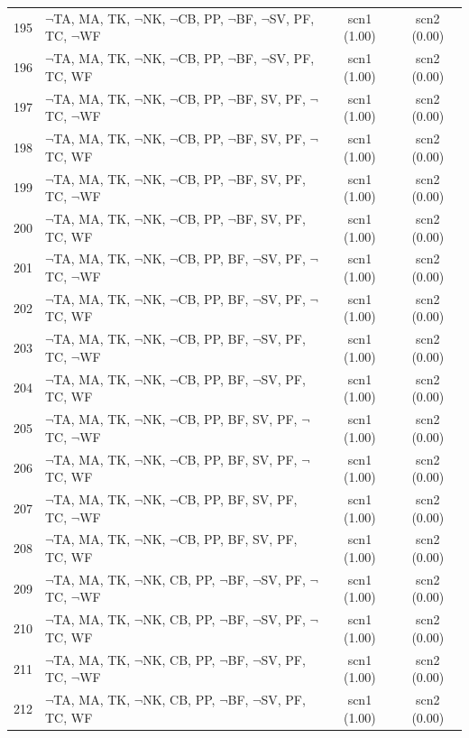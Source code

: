 \documentclass[12pt]{article}
\begin{document}
\begin{longtable}{|l|l|c|c|}
195 & $\neg$TA, MA, TK, $\neg$NK, $\neg$CB, PP, $\neg$BF, $\neg$SV, PF, TC, $\neg$WF & scn1 (1.00) & scn2 (0.00)\\
196 & $\neg$TA, MA, TK, $\neg$NK, $\neg$CB, PP, $\neg$BF, $\neg$SV, PF, TC, WF & scn1 (1.00) & scn2 (0.00)\\
197 & $\neg$TA, MA, TK, $\neg$NK, $\neg$CB, PP, $\neg$BF, SV, PF, $\neg$TC, $\neg$WF & scn1 (1.00) & scn2 (0.00)\\
198 & $\neg$TA, MA, TK, $\neg$NK, $\neg$CB, PP, $\neg$BF, SV, PF, $\neg$TC, WF & scn1 (1.00) & scn2 (0.00)\\
199 & $\neg$TA, MA, TK, $\neg$NK, $\neg$CB, PP, $\neg$BF, SV, PF, TC, $\neg$WF & scn1 (1.00) & scn2 (0.00)\\
200 & $\neg$TA, MA, TK, $\neg$NK, $\neg$CB, PP, $\neg$BF, SV, PF, TC, WF & scn1 (1.00) & scn2 (0.00)\\
201 & $\neg$TA, MA, TK, $\neg$NK, $\neg$CB, PP, BF, $\neg$SV, PF, $\neg$TC, $\neg$WF & scn1 (1.00) & scn2 (0.00)\\
202 & $\neg$TA, MA, TK, $\neg$NK, $\neg$CB, PP, BF, $\neg$SV, PF, $\neg$TC, WF & scn1 (1.00) & scn2 (0.00)\\
203 & $\neg$TA, MA, TK, $\neg$NK, $\neg$CB, PP, BF, $\neg$SV, PF, TC, $\neg$WF & scn1 (1.00) & scn2 (0.00)\\
204 & $\neg$TA, MA, TK, $\neg$NK, $\neg$CB, PP, BF, $\neg$SV, PF, TC, WF & scn1 (1.00) & scn2 (0.00)\\
205 & $\neg$TA, MA, TK, $\neg$NK, $\neg$CB, PP, BF, SV, PF, $\neg$TC, $\neg$WF & scn1 (1.00) & scn2 (0.00)\\
206 & $\neg$TA, MA, TK, $\neg$NK, $\neg$CB, PP, BF, SV, PF, $\neg$TC, WF & scn1 (1.00) & scn2 (0.00)\\
207 & $\neg$TA, MA, TK, $\neg$NK, $\neg$CB, PP, BF, SV, PF, TC, $\neg$WF & scn1 (1.00) & scn2 (0.00)\\
208 & $\neg$TA, MA, TK, $\neg$NK, $\neg$CB, PP, BF, SV, PF, TC, WF & scn1 (1.00) & scn2 (0.00)\\
209 & $\neg$TA, MA, TK, $\neg$NK, CB, PP, $\neg$BF, $\neg$SV, PF, $\neg$TC, $\neg$WF & scn1 (1.00) & scn2 (0.00)\\
210 & $\neg$TA, MA, TK, $\neg$NK, CB, PP, $\neg$BF, $\neg$SV, PF, $\neg$TC, WF & scn1 (1.00) & scn2 (0.00)\\
211 & $\neg$TA, MA, TK, $\neg$NK, CB, PP, $\neg$BF, $\neg$SV, PF, TC, $\neg$WF & scn1 (1.00) & scn2 (0.00)\\
212 & $\neg$TA, MA, TK, $\neg$NK, CB, PP, $\neg$BF, $\neg$SV, PF, TC, WF & scn1 (1.00) & scn2 (0.00)\\

\end{longtable}
\end{document}
